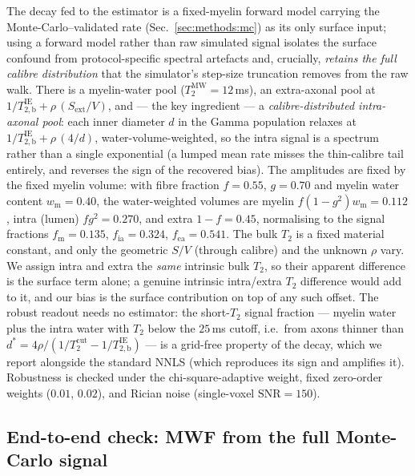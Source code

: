 The decay fed to the estimator is a fixed-myelin forward model carrying the
Monte-Carlo--validated rate (Sec.~\ref{sec:methods:mc}) as its only surface input; using
a forward model rather than raw simulated signal isolates the surface confound from
protocol-specific spectral artefacts and, crucially, \emph{retains the full calibre
distribution} that the simulator's step-size truncation removes from the raw walk. There
is a myelin-water pool ($T_2^{\mathrm{MW}}=12$\,ms), an extra-axonal pool at
$1/T_{2,\mathrm{b}}^{\mathrm{IE}}+\rho\,(S_{\mathrm{ext}}/V)$, and --- the key ingredient
--- a \emph{calibre-distributed intra-axonal pool}: each inner diameter $d$ in the Gamma
population relaxes at $1/T_{2,\mathrm{b}}^{\mathrm{IE}}+\rho\,(4/d)$, water-volume-weighted,
so the intra signal is a spectrum rather than a single exponential (a lumped mean rate
misses the thin-calibre tail entirely, and reverses the sign of the recovered bias). The
amplitudes are fixed by the fixed myelin volume: with fibre fraction $f=0.55$, $g=0.70$ and
myelin water content $w_{\mathrm m}=0.40$, the water-weighted volumes are myelin
$f(1-g^2)w_{\mathrm m}=0.112$, intra (lumen) $f g^2=0.270$, and extra $1-f=0.45$, normalising
to the signal fractions $f_{\mathrm m}=0.135$, $f_{\mathrm{ia}}=0.324$,
$f_{\mathrm{ea}}=0.541$. The bulk $T_2$ is a fixed material constant, and only the geometric
$S/V$ (through calibre) and the unknown $\rho$ vary. We assign intra and extra the \emph{same}
intrinsic bulk $T_2$, so their apparent difference is the surface term alone; a genuine
intrinsic intra/extra $T_2$ difference would add to it, and our bias is the surface
contribution on top of any such offset. The
robust readout needs no estimator: the short-$T_2$ signal fraction --- myelin water plus
the intra water with $T_2$ below the $25$\,ms cutoff, i.e.\ from axons thinner than
$d^{\ast}=4\rho/(1/T_2^{\mathrm{cut}}-1/T_{2,\mathrm{b}}^{\mathrm{IE}})$ --- is a grid-free
property of the decay, which we report alongside the standard NNLS (which reproduces its
sign and amplifies it). Robustness is checked under the chi-square-adaptive weight, fixed
zero-order weights ($0.01$, $0.02$), and Rician noise (single-voxel $\mathrm{SNR}=150$).

\subsection{End-to-end check: MWF from the full Monte-Carlo signal}
\label{sec:methods:engine}

